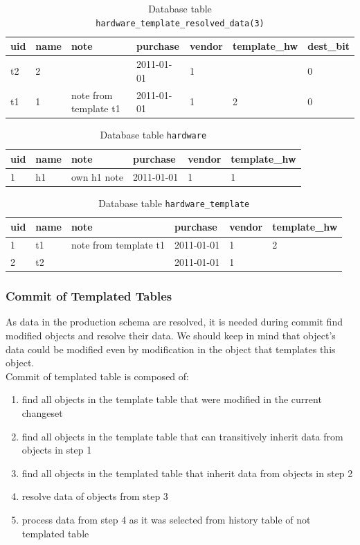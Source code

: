 \documentclass[deska]{subfiles}
\begin{document}
\begin{longtable}{ l | l | l | l | l | l | l }
    \caption{Database table \\ {\tt hardware\_template\_resolved\_data(3)}}
    \label{tab:templ-hwtemplres2} \\
    uid & name & note & purchase & vendor & template\_hw & dest\_bit\\
    \hline
    \endhead
    t2 & 2 &  & 2011-01-01 & 1 &  & 0\\
    t1 & 1 & note from template t1 & 2011-01-01 & 1 & 2 & 0\\
    \hline
\end{longtable}

\begin{longtable}{ l | l | l | l | l | l }
    \caption{Database table {\tt hardware}}
    \label{tab:templ-hw} \\
    uid & name & note & purchase & vendor & template\_hw\\
    \hline
    \endhead
    1 & h1 & own h1 note & 2011-01-01 & 1 & 1\\
    \hline
\end{longtable}

\begin{longtable}{ l | l | l | l | l | l }
    \caption{Database table {\tt hardware\_template}}
    \label{tab:templ-hwtempl} \\
    uid & name & note & purchase & vendor & template\_hw\\
    \hline
    \endhead
    1 & t1 & note from template t1 & 2011-01-01 & 1 & 2\\
    2 & t2 &  & 2011-01-01 & 1 & \\
    \hline
\end{longtable}

\subsubsection{Commit of Templated Tables}
As data in the production schema are resolved, it is needed during commit find modified objects and resolve their data. We should keep in mind that object's data could be modified even by modification in the object that templates this object.\\
Commit of templated table is composed of:
\begin{enumerate}
    \item find all objects in the template table that were modified in the current changeset
    \item find all objects in the template table that can transitively inherit data from objects in step 1
    \item find all objects in the templated table that inherit data from objects in step 2
    \item resolve data of objects from step 3
    \item process data from step 4 as it was selected from history table of not templated table
\end{enumerate}
\end{document}
